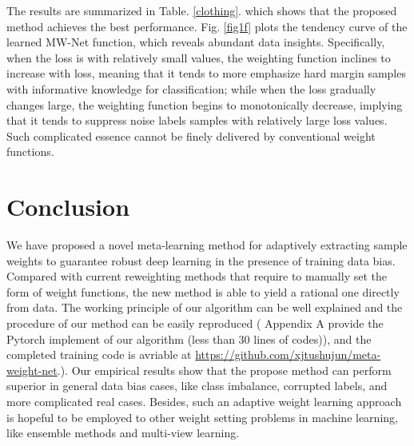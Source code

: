 \documentclass{article}
\begin{document}
	\begin{table}
		\caption{ Classification accuracy (\%) of all competing methods on the Clothing1M test set.}\label{clothing}
		\centering\tiny\vspace{0mm}
		\vspace{0mm}
	\end{table}
	
	The results are summarized in Table. \ref{clothing}. which shows that the proposed method achieves the best performance. Fig. \ref{fig1f} plots the tendency curve of the learned MW-Net function, which reveals abundant data insights. Specifically, when the loss is with relatively small values, the weighting function inclines to increase with loss, meaning that it tends to more emphasize hard margin samples with informative knowledge for classification; while when the loss gradually changes large, the weighting function begins to monotonically decrease, implying that it tends to suppress noise labels samples with relatively large loss values. Such complicated essence cannot be finely delivered by conventional weight functions.
	
	\vspace{-2mm}
	\section{Conclusion}\vspace{-2mm}
	We have proposed a novel meta-learning method for adaptively extracting sample weights to guarantee robust deep learning in the presence of training data bias. Compared with current reweighting methods that require to manually set the form of weight functions, the new method is able to yield a rational one directly from data. The working principle of our algorithm can be well explained and the procedure of our method can be easily reproduced ( Appendix A provide the Pytorch implement of our algorithm (less than 30 lines of codes)), and the completed training code is avriable at \url{https://github.com/xjtushujun/meta-weight-net}.). Our empirical results show that the propose method can perform superior in general data bias cases, like class imbalance, corrupted labels, and more complicated real cases.  Besides, such an adaptive weight learning approach is hopeful to be employed to other weight setting problems in machine learning, like ensemble methods and multi-view learning.
	
\end{document}
